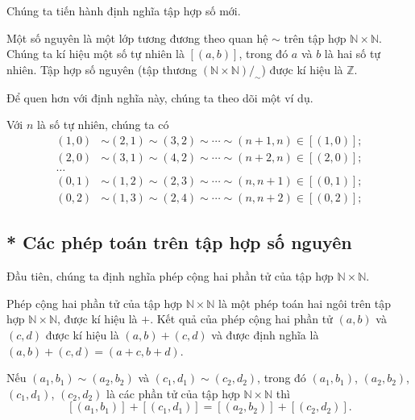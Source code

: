 Chúng ta tiến hành định nghĩa tập hợp số mới.
\begin{definition}
    Một số nguyên là một lớp tương đương theo quan hệ $\sim$ trên tập hợp $\mathbb{N}\times\mathbb{N}$. Chúng ta kí hiệu một số tự nhiên là $[(a, b)]$, trong đó $a$ và $b$ là hai số tự nhiên. Tập hợp số nguyên (tập thương $(\mathbb{N}\times\mathbb{N})/_{\sim}$) được kí hiệu là $\mathbb{Z}$.
\end{definition}

Để quen hơn với định nghĩa này, chúng ta theo dõi một ví dụ.
\begin{example}
    Với $n$ là số tự nhiên, chúng ta có
    \begin{align*}
        (1, 0) & \sim (2, 1) \sim (3, 2) \sim \cdots \sim (n+1, n) \in [(1, 0)]; \\
        (2, 0) & \sim (3, 1) \sim (4, 2) \sim \cdots \sim (n+2, n) \in [(2, 0)]; \\
        \ldots                                                                   \\
        (0, 1) & \sim (1, 2) \sim (2, 3) \sim \cdots \sim (n, n+1) \in [(0, 1)]; \\
        (0, 2) & \sim (1, 3) \sim (2, 4) \sim \cdots \sim (n, n+2) \in [(0, 2)];
    \end{align*}
\end{example}

\subsection{* Các phép toán trên tập hợp số nguyên}

Đầu tiên, chúng ta định nghĩa phép cộng hai phần tử của tập hợp $\mathbb{N}\times\mathbb{N}$.
\begin{proposition}
    Phép cộng hai phần tử của tập hợp $\mathbb{N}\times\mathbb{N}$ là một phép toán hai ngôi trên tập hợp $\mathbb{N}\times\mathbb{N}$, được kí hiệu là $+$. Kết quả của phép cộng hai phần tử $(a, b)$ và $(c, d)$ được kí hiệu là $(a, b) + (c, d)$ và được định nghĩa là $(a, b) + (c, d) = (a+c, b+d)$.

    Nếu $(a_{1}, b_{1}) \sim (a_{2}, b_{2})$ và $(c_{1}, d_{1})\sim (c_{2}, d_{2})$, trong đó $(a_{1}, b_{1})$, $(a_{2}, b_{2})$, $(c_{1}, d_{1})$, $(c_{2}, d_{2})$ là các phần tử của tập hợp $\mathbb{N}\times\mathbb{N}$ thì
    \[
        [(a_{1}, b_{1})] + [(c_{1}, d_{1})] = [(a_{2}, b_{2})] + [(c_{2}, d_{2})].
    \]
\end{proposition}

